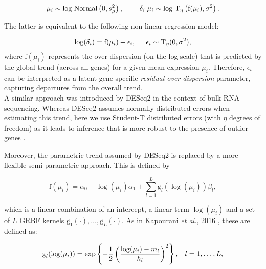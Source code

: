 \begin{equation} \label{eq::jointprior} \mu_i \sim \text{log-Normal}\left(0, s^2_{\mu}\right), \hspace{0.8cm}
\delta_i | \mu_i \sim \text{log-}\text{T}_{\eta}\left( \text{f}(\mu_i), \sigma^2 \right).
\end{equation} 

The latter is equivalent to the following non-linear regression model:

\begin{equation} \label{eq::regression}
\log(\delta_i) =\text{f}(\mu_i)+\epsilon_i, \hspace{0.5cm} \epsilon_i \sim{}\text{T}_{\eta}(0,\sigma^2), 
\end{equation} where $\text{f}(\mu_i)$ represents the over-dispersion (on the log-scale) that is predicted by the global trend (across all genes) for a given mean expression $\mu_i$. 
Therefore, $\epsilon_i$ can be interpreted as a latent gene-specific \textit{residual over-dispersion} parameter, capturing departures from the overall trend. \\

A similar approach was introduced by DESeq2 \citep{Love2014} in the context of bulk RNA sequencing. 
Whereas DESeq2 assumes normally distributed errors when estimating this trend, here we use Student-T distributed errors (with $\eta$ degrees of freedom) as it leads to inference that is more robust to the presence of outlier genes \citep{Fernandez1999}. 

\newpage

Moreover, the parametric trend assumed by DESeq2 is replaced by a more flexible semi-parametric approach. This is defined by

\begin{equation} \label{eq::trend}
\text{f}(\mu_i) = \alpha_0 + \log(\mu_i)\alpha_1 + \sum_{l=1}^L \text{g}_l(\log(\mu_i))\beta_l,
\end{equation} 

which is a linear combination of an intercept, a linear term $\log(\mu_i)$ and a set of $L$ \gls{GRBF} kernels $\text{g}_1(\cdot), \ldots, \text{g}_L(\cdot)$. As in Kapourani \emph{et al.}, 2016 \cite{Kapourani2016}, these are defined as: 

\begin{equation} \label{eq::GRBF}
\text{g}_l(\log(\mu_i)) = \exp\left\lbrace-\frac{1}{2}\left(\dfrac{\log(\mu_i)-m_l}{h_l}\right)^2\right\rbrace, \hspace{0.3cm} l = 1, \ldots, L,
\end{equation} 


